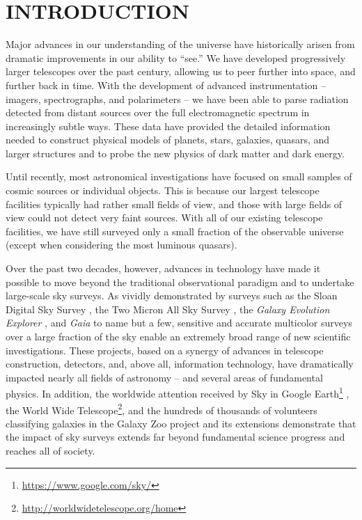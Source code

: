 \section{INTRODUCTION} %

Major advances in our understanding of the universe have historically arisen
from dramatic improvements in our ability to ``see.'' We have developed
progressively larger telescopes over the past century, allowing us
to peer further into space, and further back in time. With the development of
advanced instrumentation -- imagers, spectrographs, and polarimeters -- we
have been able to parse radiation detected from distant sources over the
full electromagnetic spectrum in increasingly subtle ways.
These data have provided the detailed information needed to construct physical
models of planets, stars, galaxies, quasars, and larger structures and to probe the
new physics of dark matter and dark energy.

Until recently, most astronomical investigations have focused on small samples
of cosmic sources or individual objects. This is because our largest telescope
facilities typically had rather small fields of view, and those with large
fields of view could not detect very faint sources. With all of our existing
telescope facilities, we have still surveyed only a small fraction of the
observable universe (except when considering the most luminous quasars).

Over the past two decades, however, advances in technology have made it possible to
move beyond the traditional observational paradigm and to undertake large-scale
sky surveys. As vividly demonstrated by surveys such as the Sloan Digital Sky
Survey \citep[SDSS;][]{2000AJ....120.1579Y}, the Two Micron All Sky Survey \citep[2MASS;][]{2006AJ....131.1163S},
the \textit{Galaxy Evolution Explorer} \citep[\textit{GALEX};][]{2005ApJ...619L...1M},
and \textit{Gaia} \citep{2016A&A...595A...2G} to name but a few, sensitive and accurate
multicolor surveys over a large fraction of the sky enable an extremely broad range of
new scientific investigations. These projects, based on a synergy of advances in
telescope construction, detectors, and, above all, information technology,
have dramatically impacted nearly all fields of astronomy
-- and several areas of fundamental physics. In addition, the worldwide attention
received by Sky in Google Earth\footnote{\url{https://www.google.com/sky/}}
\citep{2007arXiv0709.0752S}, the World Wide Telescope\footnote{\url{http://worldwidetelescope.org/home}},
and the hundreds of thousands of volunteers
classifying galaxies in the Galaxy Zoo project \citep{2011MNRAS.410..166L}
and its extensions demonstrate that the impact of sky surveys extends
far beyond fundamental science progress and reaches all of society.

